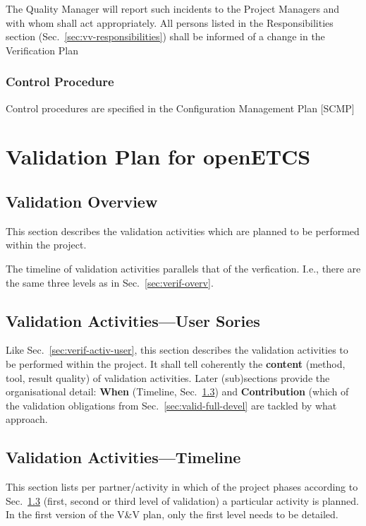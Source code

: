\documentclass{template/openetcs_report}
\begin{document}
The Quality Manager will report such incidents to the Project Managers
and with whom shall act appropriately. All persons listed in the
 Responsibilities section (Sec.~\ref{sec:vv-responsibilities}) shall be informed
of a change in the Verification Plan 

\subsubsection{Control Procedure}
Control procedures are specified in the Configuration Management Plan [SCMP]

\section{Validation Plan for openETCS}
\label{sec:valid-plan-open}

\subsection{Validation Overview}
\label{sec:valid-overv}
This section describes the validation activities which are
  planned to be performed within the project.

The timeline of validation activities parallels that of the
verfication. I.e., there are the same three levels as in
Sec.~\ref{sec:verif-overv}. 


\subsection{Validation Activities---User Sories}
\label{sec:valid-activ-user}

Like Sec.~\ref{sec:verif-activ-user}, this section describes the
validation activities to be performed within the project. It shall
tell coherently the \textbf{content} (method, tool, result quality) of
validation activities. Later (sub)sections provide the organisational
detail: \textbf{When} (Timeline, Sec.~\ref{sec:valid-activ-timel}) and
\textbf{Contribution} (which of the validation obligations from
Sec.~\ref{sec:valid-full-devel} are tackled by what approach.


\subsection{Validation Activities---Timeline}
\label{sec:valid-activ-timel}

This section lists per partner/activity in which of the project
phases according to Sec.~\ref{sec:valid-activ-timel} (first, second or
third level of validation) a particular activity is planned. In the
first version of the V\&V plan, only the first level needs to be detailed.
\end{document}
